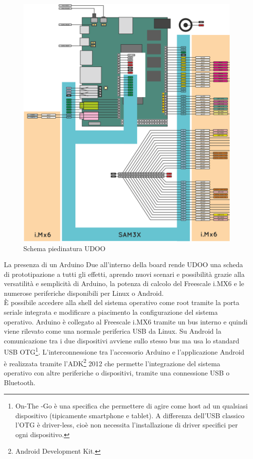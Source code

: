 \begin{figure}[!htb] \center
\includegraphics[width=\textwidth]{immagini/udoo_pinout.png}
\caption{Schema piedinatura UDOO} 
\end{figure}

La presenza di un Arduino Due all'interno della board rende UDOO una scheda di 
prototipazione a tutti gli effetti, aprendo nuovi scenari e 
possibilità grazie alla versatilità e semplicità di Arduino, la potenza di 
calcolo del Freescale i.MX6 e le numerose periferiche disponibili per Linux o 
Android.\\
È possibile accedere alla shell del 
sistema operativo come root tramite la porta seriale integrata e modificare a 
piacimento la configurazione del sistema operativo. Arduino è collegato al 
Freescale i.MX6 tramite un bus interno e quindi viene rilevato come una 
normale periferica USB da Linux. Su Android la comunicazione tra i due 
dispositivi avviene sullo stesso bus ma usa lo standard USB OTG\footnote{On-The
-Go è una specifica che permettere di agire come host ad un qualsiasi  
dispositivo (tipicamente smartphone e tablet). A differenza dell'USB classico 
l'OTG è driver-less, cioè non necessita l'installazione di driver specifici 
per ogni dispositivo.}. L'interconnessione tra l'accessorio Arduino e 
l'applicazione Android è realizzata tramite l'ADK\footnote{Android Development 
Kit.} 2012 che permette l'integrazione del sistema operativo con altre periferiche 
o dispositivi, tramite una connessione USB o Bluetooth.

